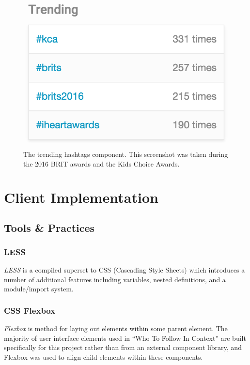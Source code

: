 \documentclass{l4proj}
\begin{document}
\begin{figure}
\centering
\includegraphics[scale=0.75]{trending.png}
\caption{The trending hashtags component. This screenshot was taken during the 2016 BRIT awards and the Kids Choice Awards.}
\label{trending}
\end{figure}
                       
                       
                          
\section{Client Implementation}
        \subsection{Tools \& Practices}
           
        \subsubsection{LESS}
        \textit{LESS} is a compiled superset to CSS (Cascading Style Sheets) which introduces a number of additional features including variables, nested definitions, and a module/import system.
        
        \subsubsection{CSS Flexbox}
        \textit{Flexbox} is method for laying out elements within some parent element. The majority of user interface elements used in ``Who To Follow In Context'' are built specifically for this project rather than from an external component library, and Flexbox was used to align child elements within these components.
\end{document}
